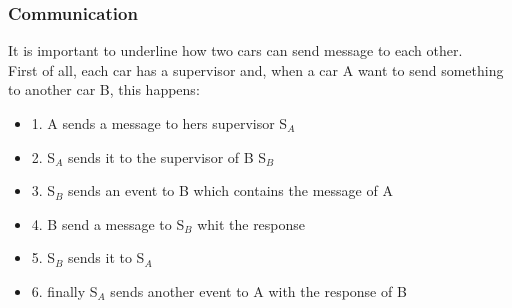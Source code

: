 \subsubsection{Communication}

It is important to underline how two cars can send message to each other. \\
First of all, each car has a supervisor and, when a car A want to send something to another car B,
this happens:
\begin{itemize}
   \item{1.} A sends a message to hers supervisor S$_{A}$
   \item {2.} S$_{A}$ sends it to the supervisor of B S$_{B}$
   \item {3.} S$_{B}$ sends an event to B which contains the message of A
   \item {4.} B send a message to S$_{B}$ whit the response
   \item {5.} S$_{B}$ sends it to S$_{A}$
   \item {6.} finally S$_{A}$ sends another event to A with the response of B
\end{itemize}
